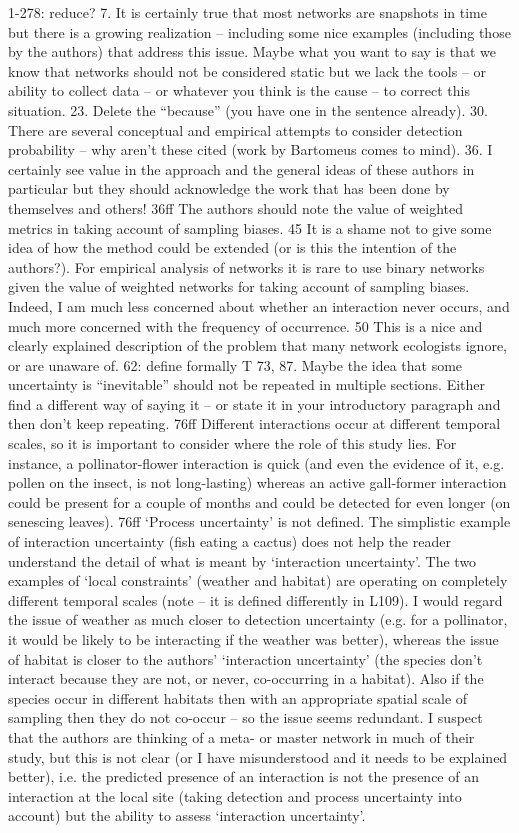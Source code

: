 1-278: reduce?
7.  It is certainly true that most networks are snapshots in time but there is a growing realization – including some nice examples (including those by the authors) that address this issue.  Maybe what you want to say is that we know that networks should not be considered static but we lack the tools – or ability to collect data – or whatever you think is the cause – to correct this situation. 
23.  Delete the “because” (you have one in the sentence already).
30.  There are several conceptual and empirical attempts to consider detection probability – why aren’t these cited (work by Bartomeus comes to mind).
36.  I certainly see value in the approach and the general ideas of these authors in particular but they should acknowledge the work that has been done by themselves and others!
36ff The authors should note the value of weighted metrics in taking account of sampling biases.
45 It is a shame not to give some idea of how the method could be extended (or is this the intention of the authors?). For empirical analysis of networks it is rare to use binary networks given the value of weighted networks for taking account of sampling biases. Indeed, I am much less concerned about whether an interaction never occurs, and much more concerned with the frequency of occurrence.
50 This is a nice and clearly explained description of the problem that many network ecologists ignore, or are unaware of.
62: define formally T
73, 87.  Maybe the idea that some uncertainty is “inevitable” should not be repeated in multiple sections.  Either find a different way of saying it – or state it in your introductory paragraph and then don’t keep repeating.
76ff Different interactions occur at different temporal scales, so it is important to consider where the role of this study lies. For instance, a pollinator-flower interaction is quick (and even the evidence of it, e.g. pollen on the insect, is not long-lasting) whereas an active gall-former interaction could be present for a couple of months and could be detected for even longer (on senescing leaves).
76ff ‘Process uncertainty’ is not defined. The simplistic example of interaction uncertainty (fish eating a cactus) does not help the reader understand the detail of what is meant by ‘interaction uncertainty’. The two examples of ‘local constraints’ (weather and habitat) are operating on completely different temporal scales (note – it is defined differently in L109). I would regard the issue of weather as much closer to detection uncertainty (e.g. for a pollinator, it would be likely to be interacting if the weather was better), whereas the issue of habitat is closer to the authors’ ‘interaction uncertainty’ (the species don’t interact because they are not, or never, co-occurring in a habitat). Also if the species occur in different habitats then with an appropriate spatial scale of sampling then they do not co-occur – so the issue seems redundant. I suspect that the authors are thinking of a meta- or master network in much of their study, but this is not clear (or I have misunderstood and it needs to be explained better), i.e. the predicted presence of an interaction is not the presence of an interaction at the local site (taking detection and process uncertainty into account) but the ability to assess ‘interaction uncertainty’.
